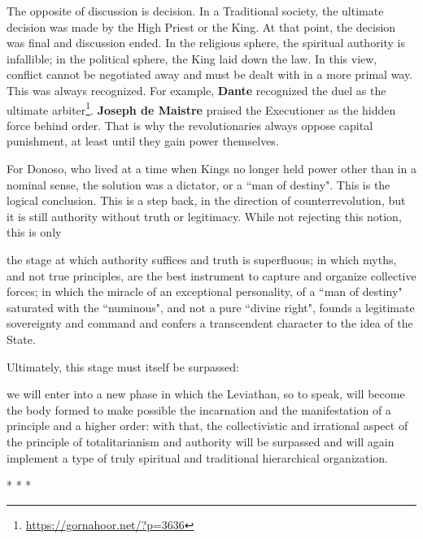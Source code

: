 The opposite of discussion is decision. In a Traditional society, the ultimate decision was made by the High Priest or the King. At that point, the decision was final and discussion ended. In the religious sphere, the spiritual authority is infallible; in the political sphere, the King laid down the law. In this view, conflict cannot be negotiated away and must be dealt with in a more primal way. This was always recognized. For example, \textbf{Dante} recognized the duel as the ultimate arbiter\footnote{\url{https://gornahoor.net/?p=3636}}. \textbf{Joseph de Maistre} praised the Executioner as the hidden force behind order. That is why the revolutionaries always oppose capital punishment, at least until they gain power themselves.

For Donoso, who lived at a time when Kings no longer held power other than in a nominal sense, the solution was a dictator, or a ``man of destiny". This is the logical conclusion. This is a step back, in the direction of counterrevolution, but it is still authority without truth or legitimacy. While not rejecting this notion, this is only

\begin{quotex}
the stage at which authority suffices and truth is superfluous; in which myths, and not true principles, are the best instrument to capture and organize collective forces; in which the miracle of an exceptional personality, of a ``man of destiny" saturated with the ``numinous", and not a pure ``divine right", founds a legitimate sovereignty and command and confers a transcendent character to the idea of the State. 

\end{quotex}
Ultimately, this stage must itself be surpassed:

\begin{quotex}
we will enter into a new phase in which the Leviathan, so to speak, will become the body formed to make possible the incarnation and the manifestation of a principle and a higher order: with that, the collectivistic and irrational aspect of the principle of totalitarianism and authority will be surpassed and will again implement a type of truly spiritual and traditional hierarchical organization. 

\end{quotex}



\begin{center}* * *\end{center}


